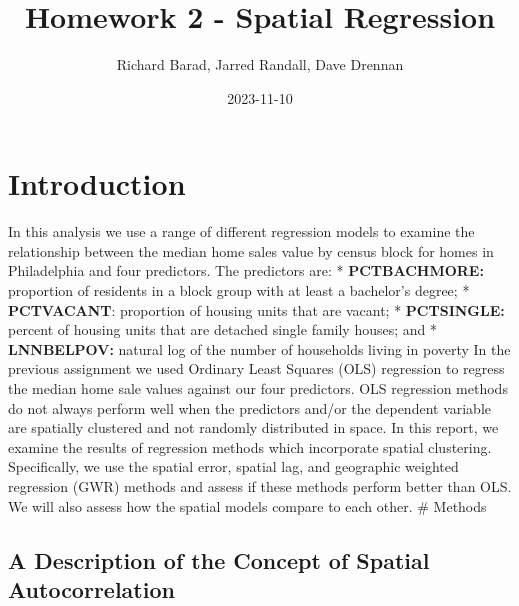 \documentclass[
]{article}
\title{Homework 2 - Spatial Regression}
\author{Richard Barad, Jarred Randall, Dave Drennan}
\date{2023-11-10}
\begin{document}
\maketitle

\hypertarget{introduction}{%
\section{Introduction}\label{introduction}}

In this analysis we use a range of different regression models to
examine the relationship between the median home sales value by census
block for homes in Philadelphia and four predictors. The predictors are:
* \textbf{PCTBACHMORE:} proportion of residents in a block group with at
least a bachelor's degree; * \textbf{PCTVACANT}: proportion of housing
units that are vacant; * \textbf{PCTSINGLE:} percent of housing units
that are detached single family houses; and * \textbf{LNNBELPOV:}
natural log of the number of households living in poverty In the
previous assignment we used Ordinary Least Squares (OLS) regression to
regress the median home sale values against our four predictors. OLS
regression methods do not always perform well when the predictors and/or
the dependent variable are spatially clustered and not randomly
distributed in space. In this report, we examine the results of
regression methods which incorporate spatial clustering. Specifically,
we use the spatial error, spatial lag, and geographic weighted
regression (GWR) methods and assess if these methods perform better than
OLS. We will also assess how the spatial models compare to each other.
\# Methods

\hypertarget{a-description-of-the-concept-of-spatial-autocorrelation}{%
\subsection{A Description of the Concept of Spatial
Autocorrelation}\label{a-description-of-the-concept-of-spatial-autocorrelation}}
\end{document}
